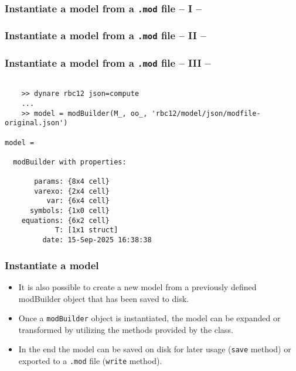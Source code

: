\documentclass[10pt,slidestop]{beamer}
\theoremstyle{plain}
\begin{document}
\begin{frame}[fragile]
  \frametitle{Instantiate a model from a \texttt{.mod} file -- I --}

  

\end{frame}

\begin{frame}[fragile]
  \frametitle{Instantiate a model from a \texttt{.mod} file -- II --}

  

\end{frame}


\begin{frame}[fragile]
  \frametitle{Instantiate a model from a \texttt{.mod} file -- III --}

  \begin{lstlisting}[style=MatlabConsole]

    >> dynare rbc12 json=compute
    ...
    >> model = modBuilder(M_, oo_, 'rbc12/model/json/modfile-original.json')

model =

  modBuilder with properties:

       params: {8x4 cell}
       varexo: {2x4 cell}
          var: {6x4 cell}
      symbols: {1x0 cell}
    equations: {6x2 cell}
            T: [1x1 struct]
         date: 15-Sep-2025 16:38:38
   \end{lstlisting}

\end{frame}


\begin{frame}[c,fragile]
  \frametitle{Instantiate a model}

  \begin{itemize}

  \item It is also possible to create a new model from a previously defined modBuilder object that has been saved to disk.\newline

  \item Once a \verb+modBuilder+ object is instantiated, the model can be expanded or transformed by utilizing the methods provided by the class.\newline

  \item In the end the model can be saved on disk for later usage (\verb+save+ method) or exported to a \verb+.mod+ file (\verb+write+ method).

  \end{itemize}

\end{frame}
\end{document}
